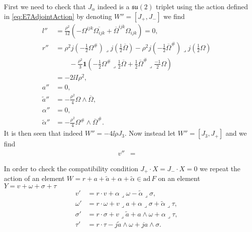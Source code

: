 First we need to check that $J_\alpha$ indeed is a $\mathfrak{su}(2)$ triplet using the action defined in \eqref{eq:E7AdjointAction} by denoting $W''=[J_+,J_-]$ we find 
\begin{equation}
    \begin{aligned}
        l''&= \frac{\rho^2}{12}(-\Omega^{ijk}\overbar{\Omega_{ijk}}+\overbar{\Omega}^{ijk}\Omega_{ijk}) = 0,\\
        r''&= \rho^2j(-\frac{1}{2}\Omega^{\#})\lrcorner j(\frac{1}{2}\overbar{\Omega})-\rho^2j(-\frac{1}{2}\overbar{\Omega}^{\#})\lrcorner j(\frac{1}{2}\Omega)\\
        &\qquad -\frac{\rho^2}{3}\mathbf{1}(-\frac{1}{2}\Omega^{\#}\lrcorner\frac{1}{2}\overbar{\Omega}+\frac{1}{2}\overbar{\Omega}^{\#}\lrcorner\frac{-1}{2}\Omega)\\
        &= -2\ii I\rho^2,\\
        a''&=0,\\
        \tilde{a}'' &= -\frac{\rho^2}{4}\Omega\wedge\overbar{\Omega},\\
        \alpha'' &= 0,\\
        \tilde{\alpha}'' &= -\frac{\rho^2}{4}\Omega^{\#}\wedge\overbar{\Omega}^{\#}.
    \end{aligned}
\end{equation}
It is then seen that indeed $W''=-4\ii\rho J_3$. Now instead let $W''=[J_3,J_+]$ and we find 
\begin{equation}
    \begin{aligned}
        v'' &= 
    \end{aligned}
\end{equation}

In order to check the compatibility condition $J_+\cdot X=J_-\cdot X=0$ we repeat the action of an element $W=r+a+\tilde{a}+\alpha+\tilde{\alpha}\in\text{ad}\,F$ on an element $Y=v+\omega+\sigma+\tau$
\begin{equation}\label{eq:E7action}
    \begin{aligned}
        v'&= r\cdot v+\alpha\lrcorner\omega-\tilde{\alpha}\lrcorner\sigma,\\
        \omega'&=r\cdot \omega+v\lrcorner a+\alpha\lrcorner\sigma+\tilde{\alpha}\lrcorner\tau,\\
        \sigma'&= r\cdot \sigma+v\lrcorner\tilde{a}+a\wedge\omega+\alpha\lrcorner\tau,\\
        \tau'&= r\cdot\tau-j\tilde{a}\wedge\omega+ja\wedge\sigma.
    \end{aligned}
\end{equation}

